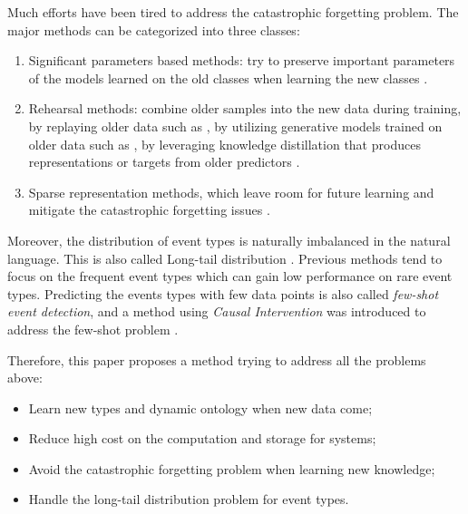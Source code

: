 Much efforts have been tired to address the catastrophic forgetting problem. The major methods can be categorized into three classes: 
\begin{enumerate}[noitemsep]
  \item Significant parameters based methods: try to preserve important parameters of the models learned on the old classes when learning the new classes \citep{kirkpatrick2017overcoming, aljundi2018memory}.
  \item Rehearsal methods: combine older samples into the new data during training, by replaying older data such as \citet{rebuffi2017icarl, hou2019learning}, by utilizing generative models trained on older data such as \citet{shin2017continual}, by leveraging knowledge distillation that produces representations or targets from older predictors \citep{li2017learning, cao2020incremental}.
  \item Sparse representation methods, which leave room for future learning and mitigate the catastrophic forgetting issues \citep{liu2019utility, aljundi2018selfless}.
\end{enumerate}

Moreover, the distribution of event types is naturally imbalanced in the natural language. This is also called Long-tail distribution \citep{yu2021lifelong}. Previous methods \citep{nguyen2016two, cao2020incremental} tend to focus on the frequent event types which can gain low performance on rare event types. Predicting the events types with few data points is also called \textit{few-shot event detection}, and a method using \textit{Causal Intervention} was introduced to address the few-shot problem \citep{chen2021honey}.

Therefore, this paper proposes a method trying to address all the problems above:
\begin{itemize}[noitemsep]
  \item Learn new types and dynamic ontology when new data come;
  \item Reduce high cost on the computation and storage for systems;
  \item Avoid the catastrophic forgetting problem when learning new knowledge;
  \item Handle the long-tail distribution problem for event types.
\end{itemize}

